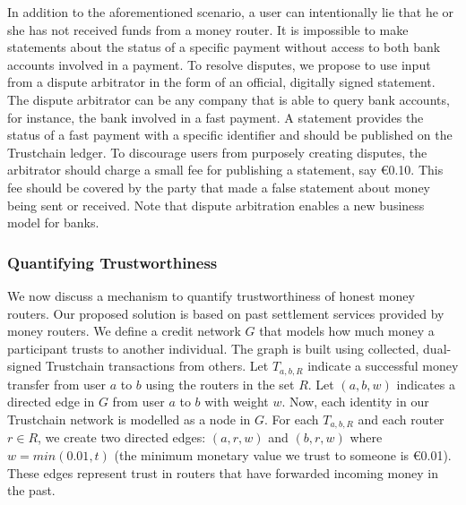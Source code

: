 In addition to the aforementioned scenario, a user can intentionally lie that he or she has not received funds from a money router. %
It is impossible to make statements about the status of a specific payment without access to both bank accounts involved in a payment.
To resolve disputes, we propose to use input from a dispute arbitrator in the form of an official, digitally signed statement.
The dispute arbitrator can be any company that is able to query bank accounts, for instance, the bank involved in a fast payment.
A statement provides the status of a fast payment with a specific identifier and should be published on the Trustchain ledger.
To discourage users from purposely creating disputes, the arbitrator should charge a small fee for publishing a statement, say \euro 0.10.
This fee should be covered by the party that made a false statement about money being sent or received.
Note that dispute arbitration enables a new business model for banks.




\subsubsection*{Quantifying Trustworthiness}
\label{sec:estimate_trust}
We now discuss a mechanism to quantify trustworthiness of honest money routers.
Our proposed solution is based on past settlement services provided by money routers.
We define a credit network $ G $ that models how much money a participant trusts to another individual.
The graph is built using collected, dual-signed Trustchain transactions from others.
Let $ T_{a,b,R} $ indicate a successful money transfer from user $ a $ to $ b $ using the routers in the set $ R $. %
Let $ (a, b, w) $ indicates a directed edge in $ G $ from user $ a $ to $ b $ with weight $ w $.
Now, each identity in our Trustchain network is modelled as a node in $ G $.
For each $ T_{a,b,R} $ and each router $ r \in R $, we create two directed edges: $ (a, r, w) $ and $ (b, r, w) $ where $ w = min(0.01, t) $ (the minimum monetary value we trust to someone is \euro 0.01).
These edges represent trust in routers that have forwarded incoming money in the past.

